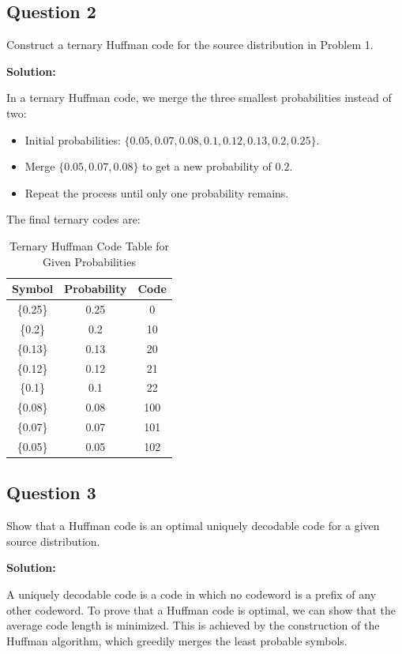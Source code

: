 \documentclass[a4paper,10pt]{article}
\begin{document}
\subsection*{Question 2}
Construct a ternary Huffman code for the source distribution in Problem 1.

\textbf{Solution:}

In a ternary Huffman code, we merge the three smallest probabilities instead of two:

\begin{itemize}
    \item Initial probabilities: $\{0.05, 0.07, 0.08, 0.1, 0.12, 0.13, 0.2, 0.25\}$.
    \item Merge $\{0.05, 0.07, 0.08\}$ to get a new probability of $0.2$.
    \item Repeat the process until only one probability remains.
\end{itemize}

The final ternary codes are:

\begin{table}[h!]
    \centering
    \begin{tabular}{|c|c|c|}
        \hline
        \textbf{Symbol} & \textbf{Probability} & \textbf{Code} \\
        \hline
        \{0.25\} & 0.25 & 0 \\
        \{0.2\} & 0.2 & 10 \\
        \{0.13\} & 0.13 & 20 \\
        \{0.12\} & 0.12 & 21 \\
        \{0.1\} & 0.1 & 22 \\
        \{0.08\} & 0.08 & 100 \\
        \{0.07\} & 0.07 & 101 \\
        \{0.05\} & 0.05 & 102 \\
        \hline
    \end{tabular}
    \caption{Ternary Huffman Code Table for Given Probabilities}
    \label{tab:ternary_huffman_code}
\end{table}



\subsection*{Question 3}
Show that a Huffman code is an optimal uniquely decodable code for a given source distribution.

\textbf{Solution:}

A uniquely decodable code is a code in which no codeword is a prefix of any other codeword. To prove that a Huffman code is optimal, we can show that the average code length is minimized. This is achieved by the construction of the Huffman algorithm, which greedily merges the least probable symbols.
\end{document}
